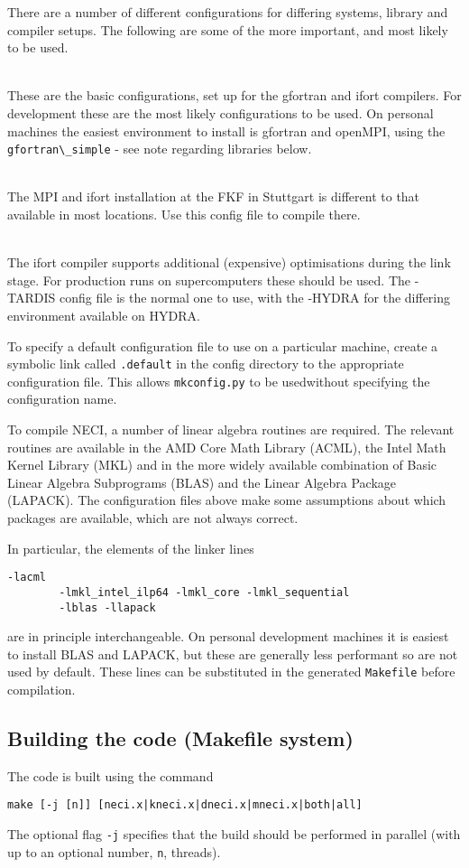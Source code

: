 \documentclass[a4paper,notitlepage]{scrreprt}
\newcommand\codeitem[1]{\needspace{1.5\baselineskip}\item[\textnormal{\ttfamily #1 \nopagebreak}] \hfill \\ \nopagebreak}
\let\code\lstinline
\begin{document}
	There are a number of different configurations for
	differing systems, library and compiler setups. The following are some of
	the more important, and most likely to be used.
	\begin{description}
		\codeitem{gfortran\_simple, ifort\_simple}
			These are the basic configurations, set up for the gfortran and
			ifort compilers. For development these are the most likely
			configurations to be used. On personal machines the easiest
			environment to install is gfortran and openMPI, using the
			\code{gfortran\_simple} - see note regarding libraries below.
		\codeitem{fkf\_ifort}
			The MPI and ifort installation at the FKF in Stuttgart is different
			to that available in most locations. Use this config file to
			compile there.
		\codeitem{PC-ifort64-MPI-TARDIS, PC-ifort64-MPI-HYDRA}
			The ifort compiler supports additional (expensive) optimisations
			during the link stage. For production runs on supercomputers these
			should be used. The -TARDIS config file is the normal one to use,
			with the -HYDRA for the differing environment available on HYDRA.
	\end{description}
	To specify a default configuration file to use on a particular machine,
	create a symbolic link called \code{.default} in the config directory
	to the appropriate configuration file. This allows \code{mkconfig.py}
	to be usedwithout specifying the configuration name.

	To compile NECI, a number of linear algebra routines are required. The
	relevant routines are available in the AMD Core Math Library (ACML), the
	Intel Math Kernel Library (MKL) and in the more widely available
	combination of Basic Linear Algebra Subprograms (BLAS) and the Linear
	Algebra Package (LAPACK). The configuration files above make some
	assumptions about which packages are available, which are not always
	correct.

	In particular, the elements of the linker lines
	\begin{lstlisting}[gobble=4]
		-lacml
		-lmkl_intel_ilp64 -lmkl_core -lmkl_sequential
		-lblas -llapack
	\end{lstlisting}
	are in principle interchangeable. On personal development machines it is
	easiest to install BLAS and LAPACK, but these are generally less
	performant so are not used by default. These lines can be substituted in
	the generated \code{Makefile} before compilation.

\subsection{Building the code (Makefile system)}
	The code is built using the command
	\begin{lstlisting}[gobble=4]
		make [-j [n]] [neci.x|kneci.x|dneci.x|mneci.x|both|all]
	\end{lstlisting}
	The optional flag \code{-j} specifies that the build should be
	performed in parallel (with up to an optional number, \code{n},
	threads).
\end{document}
